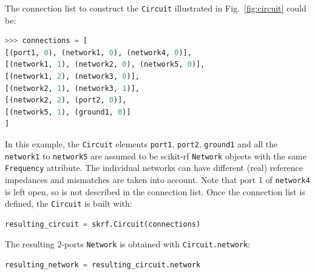 \documentclass[10pt, letterpaper]{scrartcl}
\newcommand{\skrf}{{s}cikit-rf\xspace}
\begin{document}
The connection list to construct the \texttt{Circuit} illustrated in Fig.~\ref{fig:circuit} could be:

\begin{lstlisting}[language=Python]
>>> connections = [
[(port1, 0), (network1, 0), (network4, 0)],
[(network1, 1), (network2, 0), (network5, 0)],
[(network1, 2), (network3, 0)],
[(network2, 1), (network3, 1)],
[(network2, 2), (port2, 0)],
[(network5, 1), (ground1, 0)]
]
\end{lstlisting}

In this example, the \texttt{Circuit} elements \texttt{port1}, \texttt{port2}, \texttt{ground1} and all the \texttt{network1} to \texttt{network5} are assumed to be \skrf{} \texttt{Network} objects with the same \texttt{Frequency} attribute. The individual networks can have different (real) reference impedances and mismatches are taken into account. Note that port 1 of \texttt{network4} is left open, so is not described in the connection list. Once the connection list is defined, the \texttt{Circuit} is built with:

\begin{lstlisting}[language=Python]
resulting_circuit = skrf.Circuit(connections)
\end{lstlisting}

The resulting 2-ports \texttt{Network} is obtained with \texttt{Circuit.network}:
\begin{lstlisting}[language=Python]
resulting_network = resulting_circuit.network
\end{lstlisting}

\end{document}
